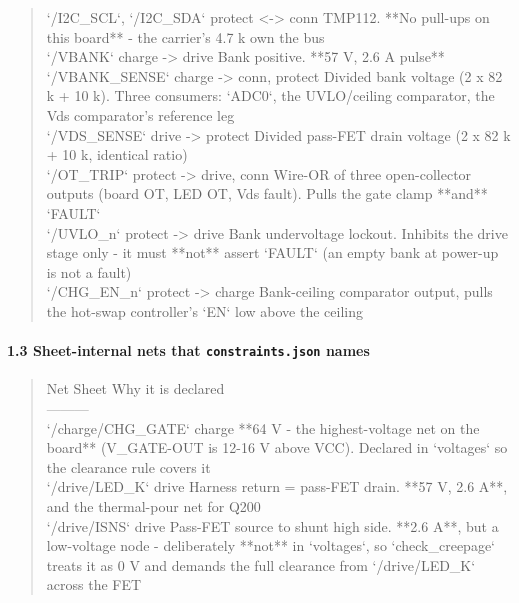\documentclass[11pt,a4paper]{article}
\begin{document}
\begin{quote}
\textbar{} `/I2C\_SCL`, `/I2C\_SDA` \textbar{} protect \textless{}-\textgreater{} conn \textbar{} TMP112. {*}{*}No pull-ups on this board{*}{*} - the carrier's 4.7 k own the bus \textbar{}\\
\textbar{} `/VBANK` \textbar{} charge -\textgreater{} drive \textbar{} Bank positive. {*}{*}57 V, 2.6 A pulse{*}{*} \textbar{}\\
\textbar{} `/VBANK\_SENSE` \textbar{} charge -\textgreater{} conn, protect \textbar{} Divided bank voltage (2 x 82 k + 10 k). Three consumers: `ADC0`, the UVLO/ceiling comparator, the Vds comparator's reference leg \textbar{}\\
\textbar{} `/VDS\_SENSE` \textbar{} drive -\textgreater{} protect \textbar{} Divided pass-FET drain voltage (2 x 82 k + 10 k, identical ratio) \textbar{}\\
\textbar{} `/OT\_TRIP` \textbar{} protect -\textgreater{} drive, conn \textbar{} Wire-OR of three open-collector outputs (board OT, LED OT, Vds fault). Pulls the gate clamp {*}{*}and{*}{*} `FAULT` \textbar{}\\
\textbar{} `/UVLO\_n` \textbar{} protect -\textgreater{} drive \textbar{} Bank undervoltage lockout. Inhibits the drive stage only - it must {*}{*}not{*}{*} assert `FAULT` (an empty bank at power-up is not a fault) \textbar{}\\
\textbar{} `/CHG\_EN\_n` \textbar{} protect -\textgreater{} charge \textbar{} Bank-ceiling comparator output, pulls the hot-swap controller's `EN` low above the ceiling \textbar{}
\end{quote}
\paragraph*{1.3 Sheet-internal nets that \texttt{constraints.json} names}
\begin{quote}\small\ttfamily\raggedright
\textbar{} Net \textbar{} Sheet \textbar{} Why it is declared \textbar{}\\
\textbar{}---\textbar{}---\textbar{}---\textbar{}\\
\textbar{} `/charge/CHG\_GATE` \textbar{} charge \textbar{} {*}{*}64 V - the highest-voltage net on the board{*}{*} (V\_GATE-OUT is 12-16 V above VCC). Declared in `voltages` so the clearance rule covers it \textbar{}\\
\textbar{} `/drive/LED\_K` \textbar{} drive \textbar{} Harness return = pass-FET drain. {*}{*}57 V, 2.6 A{*}{*}, and the thermal-pour net for Q200 \textbar{}\\
\textbar{} `/drive/ISNS` \textbar{} drive \textbar{} Pass-FET source to shunt high side. {*}{*}2.6 A{*}{*}, but a low-voltage node - deliberately {*}{*}not{*}{*} in `voltages`, so `check\_creepage` treats it as 0 V and demands the full clearance from `/drive/LED\_K` across the FET \textbar{}
\end{quote}
\end{document}
